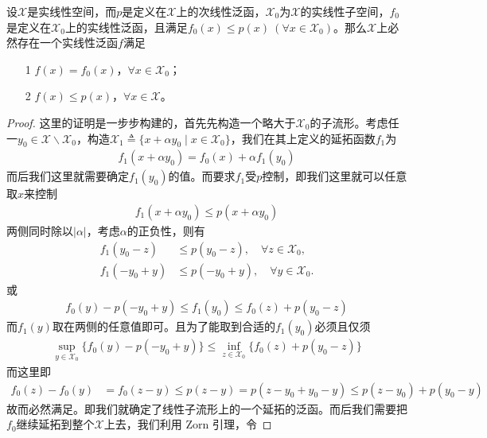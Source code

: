 \begin{theorem}
    设$\mathscr{X}$是实线性空间，而$p$是定义在$\mathscr{X}$上的次线性泛函，$\mathscr{X}_0$为$\mathscr{X}$的实线性子空间，$f_0$是定义在$\mathscr{X}_0$上的实线性泛函，且满足$f_0(x)\leqslant p(x)\ (\forall x\in \mathscr{X}_0)$。那么$\mathscr{X}$上必然存在一个实线性泛函$f$满足
    \begin{itemize}
        \item[1] $f(x) = f_0(x)$，$\forall x\in\mathscr{X}_0$；
        \item[2] $f(x) \leqslant p(x)$，$\forall x\in \mathscr{X}$。
    \end{itemize}
\end{theorem}
\begin{proof}
    这里的证明是一步步构建的，首先先构造一个略大于$\mathscr{X}_0$的子流形。考虑任一$y_0\in\mathscr{X}\backslash\mathscr{X}_0$，构造$\mathscr{X}_1\triangleq\{x + \alpha y_0\mid x\in\mathscr{X}_0\}$，我们在其上定义的延拓函数$f_1$为
    \begin{align*}
        f_1(x + \alpha y_0) = f_0(x) + \alpha f_1(y_0)
    \end{align*}
    而后我们这里就需要确定$f_1(y_0)$的值。而要求$f_1$受$p$控制，即我们这里就可以任意取$x$来控制
    \begin{align*}
        f_1(x + \alpha y_0) \leqslant p(x + \alpha y_0)
    \end{align*}
    两侧同时除以$|\alpha|$，考虑$\alpha$的正负性，则有
    \begin{align*}
        f_1(y_0 - z) &\leqslant p(y_0 - z), \quad \forall z\in\mathscr{X}_0, \\
        f_1(-y_0 + y) &\leqslant p(-y_0 + y),\quad \forall y\in\mathscr{X}_0.
    \end{align*}
    或
    \begin{align*}
        f_0(y) - p(-y_0 + y) \leqslant f_1(y_0) \leqslant f_0(z) + p(y_0 - z)
    \end{align*}
    而$f_1(y)$取在两侧的任意值即可。且为了能取到合适的$f_1(y_0)$必须且仅须
    \begin{align*}
        \sup\limits_{y\in\mathscr{X}_0} \{f_0(y) - p(-y_0 + y)\} \leqslant \inf\limits_{z\in\mathscr{X}_0} \{f_0(z) + p(y_0 - z)\}
    \end{align*}
    而这里即
    \begin{align*}
        f_0(z) - f_0(y) &= f_0(z-y) \leqslant p(z-y) = p(z - y_0 + y_0 - y) \leqslant p(z- y_0) + p(y_0 - y)
    \end{align*}
    故而必然满足。即我们就确定了线性子流形上的一个延拓的泛函。而后我们需要把$f_0$继续延拓到整个$\mathscr{X}$上去，我们利用 Zorn 引理，令

\end{proof}
